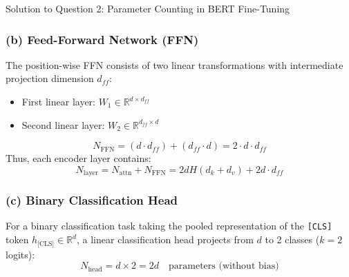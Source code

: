\documentclass[11pt,a4paper]{article}
\begin{document}
\begin{solutionbox}{Solution to Question 2: Parameter Counting in BERT Fine-Tuning}
\subsubsection*{(b) Feed-Forward Network (FFN)}
The position-wise FFN consists of two linear transformations with intermediate projection dimension $d_{ff}$:
\begin{itemize}[leftmargin=1.5em,itemsep=1pt]
    \item First linear layer: $W_1 \in \mathbb{R}^{d \times d_{ff}}$
    \item Second linear layer: $W_2 \in \mathbb{R}^{d_{ff} \times d}$
\end{itemize}
\begin{equation}
    N_{\text{FFN}} = (d \cdot d_{ff}) + (d_{ff} \cdot d) = 2 \cdot d \cdot d_{ff}
\end{equation}
Thus, each encoder layer contains:
\begin{equation}
    N_{\text{layer}} = N_{\text{attn}} + N_{\text{FFN}} = 2 d H (d_k + d_v) + 2 d \cdot d_{ff}
\end{equation}

\subsubsection*{(c) Binary Classification Head}
For a binary classification task taking the pooled representation of the \texttt{[CLS]} token $h_{\text{[CLS]}} \in \mathbb{R}^{d}$, a linear classification head projects from $d$ to 2 classes ($k = 2$ logits):
\begin{equation}
    N_{\text{head}} = d \times 2 = 2d \quad \text{parameters (without bias)}
\end{equation}


\end{solutionbox}
\end{document}

